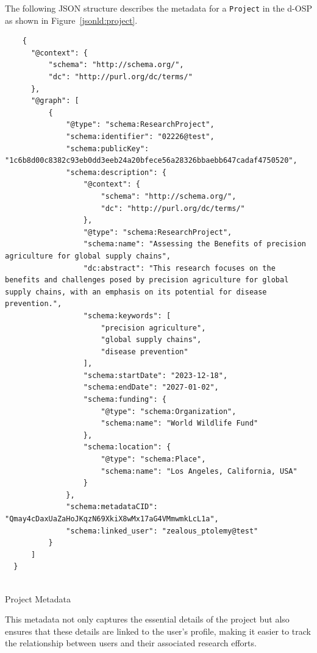 \documentclass[final]{rc-book-2.14}
\begin{document}
The following JSON structure describes the metadata for a \texttt{Project} in the d-OSP as shown in Figure~\ref{jsonld:project}.


\begin{listing}
\begin{verbatim}
    {
      "@context": {
          "schema": "http://schema.org/",
          "dc": "http://purl.org/dc/terms/"
      },
      "@graph": [
          {
              "@type": "schema:ResearchProject",
              "schema:identifier": "02226@test",
              "schema:publicKey": "1c6b8d00c8382c93eb0dd3eeb24a20bfece56a28326bbaebb647cadaf4750520",
              "schema:description": {
                  "@context": {
                      "schema": "http://schema.org/",
                      "dc": "http://purl.org/dc/terms/"
                  },
                  "@type": "schema:ResearchProject",
                  "schema:name": "Assessing the Benefits of precision agriculture for global supply chains",
                  "dc:abstract": "This research focuses on the benefits and challenges posed by precision agriculture for global supply chains, with an emphasis on its potential for disease prevention.",
                  "schema:keywords": [
                      "precision agriculture",
                      "global supply chains",
                      "disease prevention"
                  ],
                  "schema:startDate": "2023-12-18",
                  "schema:endDate": "2027-01-02",
                  "schema:funding": {
                      "@type": "schema:Organization",
                      "schema:name": "World Wildlife Fund"
                  },
                  "schema:location": {
                      "@type": "schema:Place",
                      "schema:name": "Los Angeles, California, USA"
                  }
              },
              "schema:metadataCID": "Qmay4cDaxUaZaHoJKqzN69XkiX8wMx17aG4VMmwmkLcL1a",
              "schema:linked_user": "zealous_ptolemy@test"
          }
      ]
  }
  
\end{verbatim}
\caption{Project Metadata}
\label{jsonld:project}
\end{listing}


This metadata not only captures the essential details of the project but also ensures that these details are linked to the user's profile, making it easier to track the relationship between users and their associated research efforts.
\end{document}
